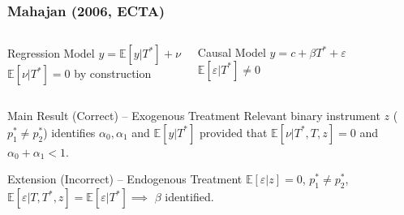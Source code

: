 \documentclass{beamer}
\begin{document}
\begin{frame}[label=MAHAJAN_BODY]
  \frametitle{Mahajan (2006, ECTA)}

  \vspace{-1em}

    \begin{columns}[c]
    \begin{exampleblock}{Regression Model}
      $y = \mathbb{E}[y|T^*] + \nu$\\
      {\small $\mathbb{E}[\nu|T^*]=0$ by construction}
    \end{exampleblock}
    \begin{exampleblock}{Causal Model}
     $y = c + \beta T^* + \varepsilon$\\
     {\small$\mathbb{E}[\varepsilon|T^*]\neq 0$}
    \end{exampleblock}
    \end{columns}

    \vspace{1.5em}
  
  \begin{block}{Main Result (Correct) -- Exogenous Treatment}
   Relevant binary instrument $z$ ($p^*_1 \neq p^*_2$) identifies $\alpha_0, \alpha_1$ and $\mathbb{E}[y|T^*]$ provided that $\mathbb{E}[\nu|T^*,T,z]=0$ and $\alpha_0 + \alpha_1 < 1$. 
  \end{block}

  \begin{alertblock}{Extension (Incorrect) -- Endogenous Treatment}
    $\mathbb{E}[\varepsilon|z]=0$, $p^*_1 \neq p^*_2$, $\mathbb{E}[\varepsilon|T,T^*,z]=\mathbb{E}[\varepsilon|T^*] \implies$ $\beta$ identified.
  \end{alertblock}

    \hyperlink{MAHAJAN_APPEND}{}
\end{frame}

\end{document}
